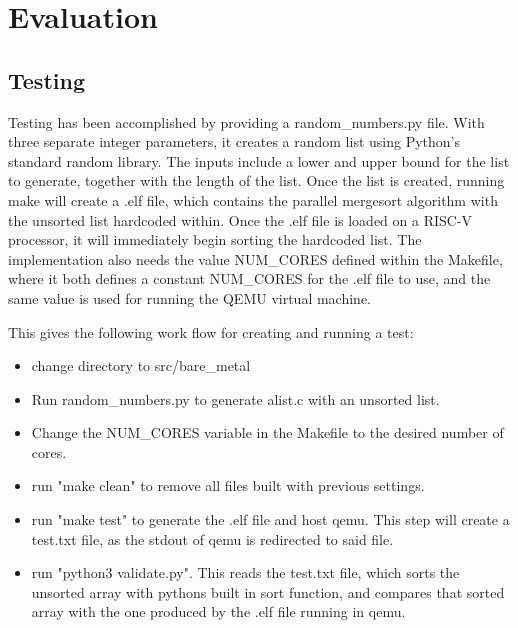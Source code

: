\section{Evaluation}

\subsection{Testing}
Testing has been accomplished by providing a random\_numbers.py file. With three
separate integer parameters, it creates a random list using Python's standard
random library. The inputs include a lower and upper bound for the list to
generate, together with the length of the list. Once the list is created,
running make will create a .elf file, which contains the parallel mergesort
algorithm with the unsorted list hardcoded within. Once the .elf file is loaded
on a RISC-V processor, it will immediately begin sorting the hardcoded list. The
implementation also needs the value NUM\_CORES defined within the Makefile, where
it both defines a constant NUM\_CORES for the .elf file to use, and the same
value is used for running the QEMU virtual machine.

This gives the following work flow for creating and running a test:
\begin{itemize}
  \item change directory to src/bare\_metal
  \item Run random\_numbers.py to generate alist.c with an unsorted list.
  \item Change the NUM\_CORES variable in the Makefile to the desired number of
    cores.
  \item run "make clean" to remove all files built with previous settings.
  \item run "make test" to generate the .elf file and host qemu. This step will
    create a test.txt file, as the stdout of qemu is redirected to said file.
  \item run "python3 validate.py". This reads the test.txt file, which sorts the
    unsorted array with pythons built in sort function, and compares that sorted
    array with the one produced by the .elf file running in qemu.
\end{itemize}

